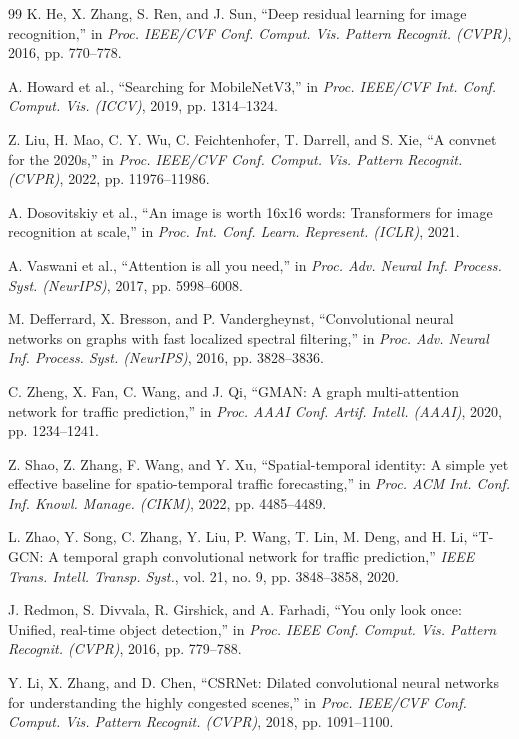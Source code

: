 \documentclass[12pt,a4paper,oneside]{report}
\begin{document}
\begin{thebibliography}{99}
 K. He, X. Zhang, S. Ren, and J. Sun, ``Deep residual learning for image recognition,'' in \textit{Proc. IEEE/CVF Conf. Comput. Vis. Pattern Recognit. (CVPR)}, 2016, pp. 770--778.

 A. Howard et al., ``Searching for MobileNetV3,'' in \textit{Proc. IEEE/CVF Int. Conf. Comput. Vis. (ICCV)}, 2019, pp. 1314--1324.

 Z. Liu, H. Mao, C. Y. Wu, C. Feichtenhofer, T. Darrell, and S. Xie, ``A convnet for the 2020s,'' in \textit{Proc. IEEE/CVF Conf. Comput. Vis. Pattern Recognit. (CVPR)}, 2022, pp. 11976--11986.

 A. Dosovitskiy et al., ``An image is worth 16x16 words: Transformers for image recognition at scale,'' in \textit{Proc. Int. Conf. Learn. Represent. (ICLR)}, 2021.

 A. Vaswani et al., ``Attention is all you need,'' in \textit{Proc. Adv. Neural Inf. Process. Syst. (NeurIPS)}, 2017, pp. 5998--6008.

 M. Defferrard, X. Bresson, and P. Vandergheynst, ``Convolutional neural networks on graphs with fast localized spectral filtering,'' in \textit{Proc. Adv. Neural Inf. Process. Syst. (NeurIPS)}, 2016, pp. 3828--3836.

 C. Zheng, X. Fan, C. Wang, and J. Qi, ``GMAN: A graph multi-attention network for traffic prediction,'' in \textit{Proc. AAAI Conf. Artif. Intell. (AAAI)}, 2020, pp. 1234--1241.

 Z. Shao, Z. Zhang, F. Wang, and Y. Xu, ``Spatial-temporal identity: A simple yet effective baseline for spatio-temporal traffic forecasting,'' in \textit{Proc. ACM Int. Conf. Inf. Knowl. Manage. (CIKM)}, 2022, pp. 4485--4489.

 L. Zhao, Y. Song, C. Zhang, Y. Liu, P. Wang, T. Lin, M. Deng, and H. Li, ``T-GCN: A temporal graph convolutional network for traffic prediction,'' \textit{IEEE Trans. Intell. Transp. Syst.}, vol. 21, no. 9, pp. 3848--3858, 2020.

 J. Redmon, S. Divvala, R. Girshick, and A. Farhadi, ``You only look once: Unified, real-time object detection,'' in \textit{Proc. IEEE Conf. Comput. Vis. Pattern Recognit. (CVPR)}, 2016, pp. 779--788.

 Y. Li, X. Zhang, and D. Chen, ``CSRNet: Dilated convolutional neural networks for understanding the highly congested scenes,'' in \textit{Proc. IEEE/CVF Conf. Comput. Vis. Pattern Recognit. (CVPR)}, 2018, pp. 1091--1100.


\end{thebibliography}
\end{document}
